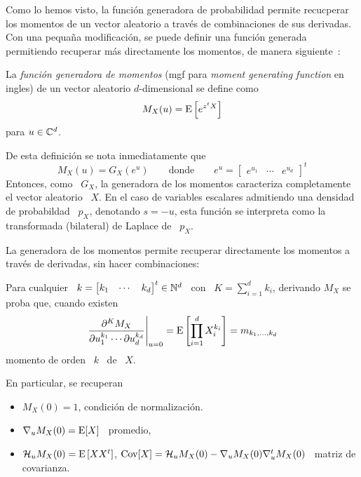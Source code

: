 
\label{Ssec:MP:GeneradoraMomentos}


Como lo hemos visto, la  funci\'on generadora de probabilidad permite recucperar
los  momentos  de  un  vector  aleatorio  a trav\'es  de  combinaciones  de  sus
derivadas.   Con una pequa\~na  modificaci\'on, se  puede definir  una funci\'on
generada  permitiendo  recuperar  m\'as  directamente los  momentos,  de  manera
siguiente~\cite{Fel68, JohKot97, Muk00, AthLah06}:
%
\begin{definicion}
\label{Def:MP:GeneradoraMomentos}
%
  La {\em  funci\'on generadora  de momentos} (mgf  para {\em  moment generating
    function} en ingles) de un vector aleatorio $d$-dimensional se define como
  \[
  M_X(u) = \operatorname{E}\left[ e^{z^t X} \right]
  \]
  para $u \in \mathbb{C}^d$.
\end{definicion}
%
De esta definici\'on se nota inmediatamente que
%
\[
M_X(u) = G_X\left( e^u \right)  \qquad \mbox{donde} \qquad e^u = \begin{bmatrix}
  e^{u_1} & \cdots & e^{u_d} \end{bmatrix}^t
\]
%
Entonces, como \ $G_X$, la  generadora de los momentos caracteriza completamente
el  vector  aleatorio \  $X$.      En el  caso de
variables escalares admitiendo una densidad de probabildad \ $p_X$, denotando $s
= -u$, esta funci\'on se  interpreta como la transformada (bilateral) de Laplace
de \ $p_X$.


La  generadora de  los momentos  permite recuperar  directamente los  momentos a
trav\'es de derivadas, sin hacer combinaciones:
%
\begin{lema}
\label{Lem:MP:GenracionMomentos}
%
  Para cualquier \  $k = \begin{bmatrix} k_1 & \cdots  & k_d \end{bmatrix}^t \in
  \mathbb{N}^d$ \ con \ $K =  \sum_{i=1}^d k_i$, derivando $M_X$ se proba que, cuando
  existen
  \[
  \left.\frac{\partial^K     M_X}{\partial     u_1^{k_1}     \cdots     \partial
      u_d^{k_d}}\right|_{u=0}  = \operatorname{E}\left[  \prod_{i=1}^d  X_i^{k_i} \right]  =
  m_{k_1,\ldots,k_d}
  \]
  momento de orden \ $k$ \ de \ $X$.
\end{lema}
%
En particular, se recuperan
%
\begin{itemize}
\item $M_X(0) = 1$, condici\'on de normalizaci\'on.
%
\item $\nabla_u M_X(0) = \operatorname{E}[X]$ \ promedio,
%
\item $\mathcal{H}_u M_X(0) = \operatorname{E}\left[ X X^t \right]$, \ie $\operatorname{Cov}[X] = \mathcal{H}_u M_X(0)
  - \nabla_u M_X(0) \nabla_u^t M_X(0)$ \ matriz de covarianza.
\end{itemize}

